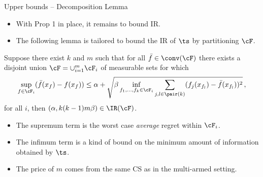 \begin{frame}{Upper bounds -- Decomposition Lemma}
    \small
    \begin{itemize}
        \item With Prop 1 in place, it remains to bound IR.
        \item The following lemma is tailored to bound the IR of $\ts$ by partitioning $\cF$.
    \end{itemize}
    \begin{tcolorbox}[title=Proposition 5 -- $\ts$-IR Decomposition,colback=blue!5!white,colframe=blue!50!black]
        Suppose there exist $k$ and $m$ such that for all $\bar f \in \conv(\cF)$ there exists a disjoint union $\cF = \cup_{i=1}^m \cF_i$ of measurable sets
        for which
        \begin{align*}
            \sup_{f \in \cF_i} (\bar f(x_f) - f(x_f)) \leq \alpha + \sqrt{\beta \inf_{f_1,\ldots,f_k \in \cF_i} \sum_{j,l \in \pair(k)} (f_j(x_{f_l}) - \bar f(x_{f_l}))^2} \,,
        \end{align*}
        for all $i$, then $(\alpha, k(k-1)m\beta) \in \IR(\cF)$.
    \end{tcolorbox}
    \begin{itemize}
        \item<1-> The supremum term is the worst case \emph{average} regret within $\cF_i$.
        \item<2-> The infimum term is a kind of bound on the minimum amount of information obtained by $\ts$.
        \item<3-> The price of $m$ comes from the same CS as in the multi-armed setting.
    \end{itemize}
\end{frame}
